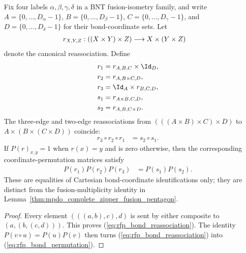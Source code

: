 \begin{lemma}%
    \label{thm:mpdo_fourfold_bond_coordinate_coherence}
    \leanok
    Fix four labels $\alpha,\beta,\gamma,\delta$ in a BNT fusion-isometry
    family, and write $A=\{0,\ldots,D_\alpha-1\}$,
    $B=\{0,\ldots,D_\beta-1\}$, $C=\{0,\ldots,D_\gamma-1\}$, and
    $D=\{0,\ldots,D_\delta-1\}$ for their bond-coordinate sets. Let
    \begin{align}
        r_{X,Y,Z}:((X\times Y)\times Z)
         & \longrightarrow X\times(Y\times Z) \notag
    \end{align}
    denote the canonical reassociation. Define
    \begin{align}
        r_1 & =r_{A,B,C}\times\Id_D, \notag  \\
        r_2 & =r_{A,B\times C,D}, \notag     \\
        r_3 & =\Id_A\times r_{B,C,D}, \notag \\
        s_1 & =r_{A\times B,C,D}, \notag     \\
        s_2 & =r_{A,B,C\times D}. \notag
    \end{align}
    The three-edge and two-edge reassociations from
    $(((A\times B)\times C)\times D)$ to
    $A\times(B\times(C\times D))$ coincide:
    \begin{align}
        r_3\circ r_2\circ r_1
         & =s_2\circ s_1.
        \label{eq:rfp_bond_reassociation}
    \end{align}
    If $P(r)_{x,y}=1$ when $r(x)=y$ and is zero otherwise, then the
    corresponding coordinate-permutation matrices satisfy
    \begin{align}
        P(r_1)P(r_2)P(r_3)
         & =P(s_1)P(s_2).
        \label{eq:rfp_bond_permutation}
    \end{align}
    These are equalities of Cartesian bond-coordinate identifications only;
    they are distinct from the fusion-multiplicity identity in
    Lemma~\ref{thm:mpdo_complete_zipper_fusion_pentagon}.
\end{lemma}
\begin{proof}\leanok
    Every element $(((a,b),c),d)$ is sent by either composite to
    $(a,(b,(c,d)))$. This proves (\ref{eq:rfp_bond_reassociation}). The
    identity $P(v\circ u)=P(u)P(v)$ then turns
    (\ref{eq:rfp_bond_reassociation}) into
    (\ref{eq:rfp_bond_permutation}).
\end{proof}

